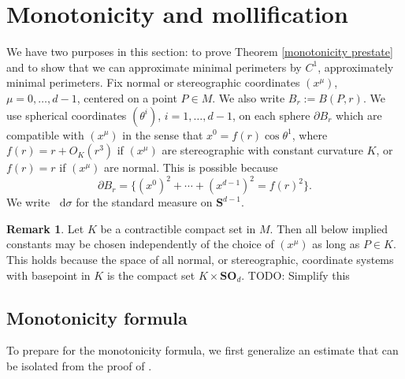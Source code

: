 \documentclass[reqno,10pt]{amsart}
\newcommand{\Sph}{\mathbf S}
\newcommand{\SpOrth}{\mathbf{SO}}
\newcommand*\dif{\mathop{}\!\mathrm{d}}
\theoremstyle{definition}
\newtheorem{remark}[theorem]{Remark}
\numberwithin{equation}{section}
\begin{document}

\section{Monotonicity and mollification}\label{MollifierSection}
We have two purposes in this section: to prove Theorem \ref{monotonicity prestate} and to show that we can approximate minimal perimeters by $C^1$, approximately minimal perimeters.
Fix normal or stereographic coordinates $(x^\mu)$, $\mu = 0, \dots, d - 1$, centered on a point $P \in M$.
We also write $B_r := B(P, r)$.
We use spherical coordinates $(\theta^i)$, $i = 1, \dots, d - 1$, on each sphere $\partial B_r$ which are compatible with $(x^\mu)$ in the sense that $x^0 = f(r) \cos \theta^1$, where $f(r) = r + O_K(r^3)$ if $(x^\mu)$ are stereographic with constant curvature $K$, or $f(r) = r$ if $(x^\mu)$ are normal.
This is possible because
\begin{equation}\label{partial Br is a variety}
\partial B_r = \{(x^0)^2 + \cdots + (x^{d - 1})^2 = f(r)^2\}.
\end{equation}
We write $\dif \sigma$ for the standard measure on $\Sph^{d - 1}$.

\begin{remark}\label{independence of constants}
Let $K$ be a contractible compact set in $M$.
Then all below implied constants may be chosen independently of the choice of $(x^\mu)$ as long as $P \in K$.
This holds because the space of all normal, or stereographic, coordinate systems with basepoint in $K$ is the compact set $K \times \SpOrth_d$. TODO: Simplify this
\end{remark}

\subsection{Monotonicity formula}
To prepare for the monotonicity formula, we first generalize an estimate that can be isolated from the proof of \cite[Lemma 5.8]{Giusti77}.
\end{document}
